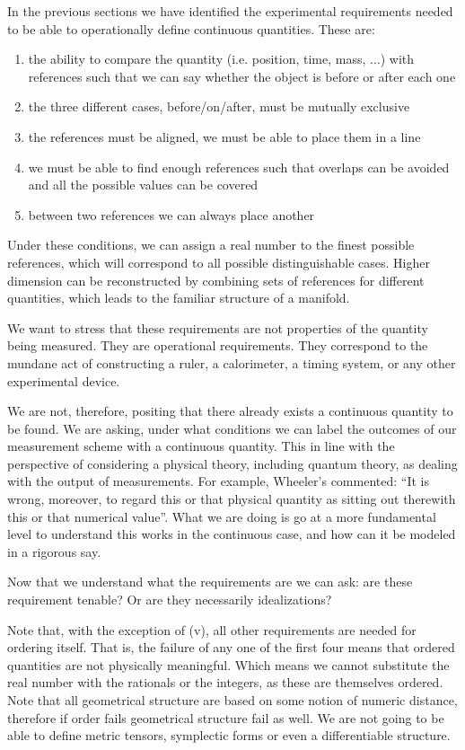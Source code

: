 \documentclass[12pt]{iopart}
\begin{document}
In the previous sections we have identified the experimental requirements needed to be able to operationally define continuous quantities. These are:
\begin{enumerate}
	\item the ability to compare the quantity (i.e. position, time, mass, ...) with references such that we can say whether the object is before or after each one
	\item the three different cases, before/on/after, must be mutually exclusive
	\item the references must be aligned, we must be able to place them in a line
	\item we must be able to find enough references such that overlaps can be avoided and all the possible values can be covered
	\item between two references we can always place another
\end{enumerate}
Under these conditions, we can assign a real number to the finest possible references, which will correspond to all possible distinguishable cases. Higher dimension can be reconstructed by combining sets of references for different quantities, which leads to the familiar structure of a manifold.

We want to stress that these requirements are not properties of the quantity being measured. They are operational requirements. They correspond to the mundane act of constructing a ruler, a calorimeter, a timing system, or any other experimental device.

We are not, therefore, positing that there already exists a continuous quantity to be found. We are asking, under what conditions we can label the outcomes of our measurement scheme with a continuous quantity. This in line with the perspective of considering a physical theory, including quantum theory, as dealing with the output of measurements. For example, Wheeler's commented: ``It is wrong, moreover, to regard this or that physical quantity as sitting out therewith this or that numerical value''. What we are doing is go at a more fundamental level to understand this works in the continuous case, and how can it be modeled in a rigorous say.

Now that we understand what the requirements are we can ask: are these requirement tenable? Or are they necessarily idealizations?

Note that, with the exception of (v), all other requirements are needed for ordering itself. That is, the failure of any one of the first four means that ordered quantities are not physically meaningful. Which means we cannot substitute the real number with the rationals or the integers, as these are themselves ordered. Note that all geometrical structure are based on some notion of numeric distance, therefore if order fails geometrical structure fail as well. We are not going to be able to define metric tensors, symplectic forms or even a differentiable structure.
\end{document}
